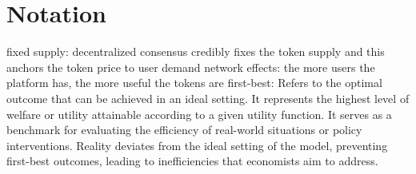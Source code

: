 
\section{Notation}

fixed supply: decentralized consensus credibly fixes the token supply and this anchors the token price to user demand
network effects: the more users the platform has, the more useful the tokens are
first-best: Refers to the optimal outcome that can be achieved in an ideal setting. It represents the highest level of welfare or utility attainable according to a given utility function. It serves as a benchmark for evaluating the efficiency of real-world situations or policy interventions. Reality deviates from the ideal setting of the model, preventing first-best outcomes, leading to inefficiencies that economists aim to address.


